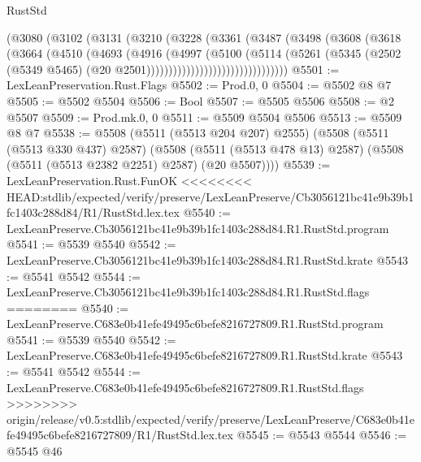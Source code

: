 \begin{lexlean}{RustStd}
\begin{coremodule}
{\begin{coremodule}
{{{{{{{{{{{{{{{{{{{{{{{{{{                          (@3080
                            (@3102
                              (@3131
                                (@3210
                                  (@3228
                                    (@3361
                                      (@3487
                                        (@3498
                                          (@3608
                                            (@3618
                                              (@3664
                                                (@4510
                                                  (@4693
                                                    (@4916
                                                      (@4997
                                                        (@5100
                                                          (@5114
                                                            (@5261
                                                              (@5345
                                                                (@2502
                                                                  (@5349 @5465)
                                                                  (@20
                                                                    @2501))))))))))))))))))))))))))))))))
@5501 := LexLeanPreservation.Rust.Flags
@5502 := Prod.{0, 0}
@5504 := @5502 @8 @7
@5505 := @5502 @5504
@5506 := Bool
@5507 := @5505 @5506
@5508 := @2 @5507
@5509 := Prod.mk.{0, 0}
@5511 := @5509 @5504 @5506
@5513 := @5509 @8 @7
@5538 := @5508
    (@5511 (@5513 @204 @207) @2555)
    (@5508
      (@5511 (@5513 @330 @437) @2587)
      (@5508 (@5511 (@5513 @478 @13) @2587) (@5508 (@5511 (@5513 @2382 @2251) @2587) (@20 @5507))))
@5539 := LexLeanPreservation.Rust.FunOK
<<<<<<<< HEAD:stdlib/expected/verify/preserve/LexLeanPreserve/Cb3056121bc41e9b39b1fc1403c288d84/R1/RustStd.lex.tex
@5540 := LexLeanPreserve.Cb3056121bc41e9b39b1fc1403c288d84.R1.RustStd.program
@5541 := @5539 @5540
@5542 := LexLeanPreserve.Cb3056121bc41e9b39b1fc1403c288d84.R1.RustStd.krate
@5543 := @5541 @5542
@5544 := LexLeanPreserve.Cb3056121bc41e9b39b1fc1403c288d84.R1.RustStd.flags
========
@5540 := LexLeanPreserve.C683e0b41efe49495c6befe8216727809.R1.RustStd.program
@5541 := @5539 @5540
@5542 := LexLeanPreserve.C683e0b41efe49495c6befe8216727809.R1.RustStd.krate
@5543 := @5541 @5542
@5544 := LexLeanPreserve.C683e0b41efe49495c6befe8216727809.R1.RustStd.flags
>>>>>>>> origin/release/v0.5:stdlib/expected/verify/preserve/LexLeanPreserve/C683e0b41efe49495c6befe8216727809/R1/RustStd.lex.tex
@5545 := @5543 @5544
@5546 := @5545 @46
}}}}}}}}}}}}}}}}}}}}}}}}}}
\end{coremodule}}
\end{coremodule}
\end{lexlean}
